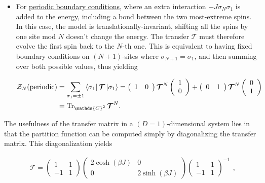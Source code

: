 \documentclass{homework}
\begin{document}
\begin{itemize}
    \item For \underline{periodic boundary conditions}, where an extra interaction $-J \sigma_N \sigma_1$ is added to the energy, including a bond between the two most-extreme spins. In this case, the model is translationally-invariant, shifting all the spins by one site mod $N$ doesn't change the energy. The transfer $\bm{\mathcal{T}}$ must therefore evolve the first spin back to the $N$-th one. This is equivalent to having fixed boundary conditions on $(N+1)$-sites where $\sigma_{N+1} = \sigma_1$, and then summing over both possible values, thus yielding 
    
    \begin{equation}
    \begin{split}
    \mathcal{Z}_N(\textnormal{periodic}) &= \sum_{\sigma_1 = \pm 1} \bra{\sigma_1} \bm{\mathcal{T}} \ket{\sigma_1} =  \left(\begin{array}{cc}
        1 & 0 \\
    \end{array}\right) \bm{\mathcal{T}}^{N} \left(\begin{array}{c}
        1 \\
        0 
    \end{array}\right) +  \left(\begin{array}{cc}
        0 & 1 \\
    \end{array}\right) \bm{\mathcal{T}}^{N} \left(\begin{array}{c}
        0 \\
        1 
    \end{array}\right) \\
    &= \Tr_{\mathds{C}^2} \bm{\mathcal{T}}^{N}.
    \end{split}
    \end{equation}
\end{itemize}

The usefulness of the transfer matrix in a $(D=1)$-dimensional system lies in that the partition function can be computed simply by diagonalizing the transfer matrix. This diagonalization yields 

\begin{equation}
    \begin{split}
    \bm{\mathcal{T}} = \left(\begin{array}{cc}
        1 & 1 \\
        -1 & 1 
    \end{array}\right)\left(\begin{array}{cc}
        2\cosh(\beta J) & 0 \\
        0 & 2\sinh(\beta J)
    \end{array}\right) \left(\begin{array}{cc}
        1 & 1 \\
        -1 & 1 
    \end{array}\right)^{-1}
    \end{split},
    \label{Ising model - T matrix diag}
\end{equation}
\end{document}
